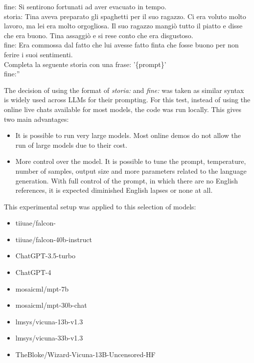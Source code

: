 \begin{itemize}
{                fine: Si sentirono fortunati ad aver evacuato in tempo.\\
                storia: Tina aveva preparato gli spaghetti per il suo ragazzo.	Ci era voluto molto lavoro, ma lei era molto orgogliosa.	Il suo ragazzo mangiò tutto il piatto e disse che era buono.	Tina assaggiò e si rese conto che era disgustoso.\\
                fine: Era commossa dal fatto che lui avesse fatto finta che fosse buono per non ferire i suoi sentimenti.\\
                Completa la seguente storia con una frase: '\{prompt\}'\\
                fine:''}
\end{itemize}
The decision of using the format of \emph{storia:} and \emph{fine:} was taken as similar syntax is widely used across LLMs for their prompting.
For this test, instead of using the online live chats available for most models, the code was run locally. This gives two main advantages:
\begin{itemize}
    \item It is possible to run very large models. Most online demos do not allow the run of large models due to their cost.
    \item More control over the model. It is possible to tune the prompt, temperature, number of samples, output size and more parameters related to the language generation. With full control of the prompt, in which there are no English references, it is expected diminished English lapses or none at all.
\end{itemize}
This experimental setup was applied to this selection of models:
\begin{itemize}
    \item   tiiuae/falcon- \cite{falcon40b}
    \item   tiiuae/falcon-40b-instruct \cite{falcon40b}
    \item   ChatGPT-3.5-turbo \cite{chatgpt}
    \item   ChatGPT-4 \cite{openai2023gpt4}
    \item   mosaicml/mpt-7b \cite{mpt7b}
    \item   mosaicml/mpt-30b-chat \cite{mpt30b}
    \item   lmsys/vicuna-13b-v1.3 \cite{touvron2023llama}
    \item   lmsys/vicuna-33b-v1.3 \cite{touvron2023llama}
    \item   TheBloke/Wizard-Vicuna-13B-Uncensored-HF \cite{wizard-vicuna}
\end{itemize}
